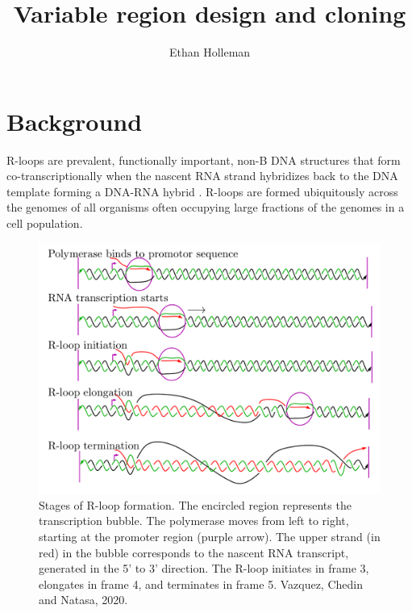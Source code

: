 \documentclass[11pt]{article}
\author{Ethan Holleman}
\title{Variable region design and cloning}
\begin{document}
\maketitle

\tableofcontents
\pagebreak

\section{Background}

R-loops are prevalent, functionally important, non-B DNA structures that form co-transcriptionally when the nascent RNA strand hybridizes back to the DNA template forming a DNA-RNA hybrid \cite{chedin_nascent_2016}. R-loops are formed ubiquitously across the genomes of all organisms often occupying large fractions of the genomes in a cell population. 

\begin{figure}[H]
	\includegraphics[width=12cm]{images/r-loops/rloop_stages.png}
	\centering
	\caption{Stages of R-loop formation. The encircled region represents the transcription bubble. The polymerase moves from left to right, starting at the promoter region (purple arrow). The upper strand (in red) in the bubble corresponds to the nascent RNA transcript, generated in the 5' to 3' direction. The R-loop initiates in frame 3, elongates in frame 4, and terminates in frame 5. Vazquez, Chedin and Natasa, 2020.}
	\label{fig:1}
\end{figure}
\end{document}
